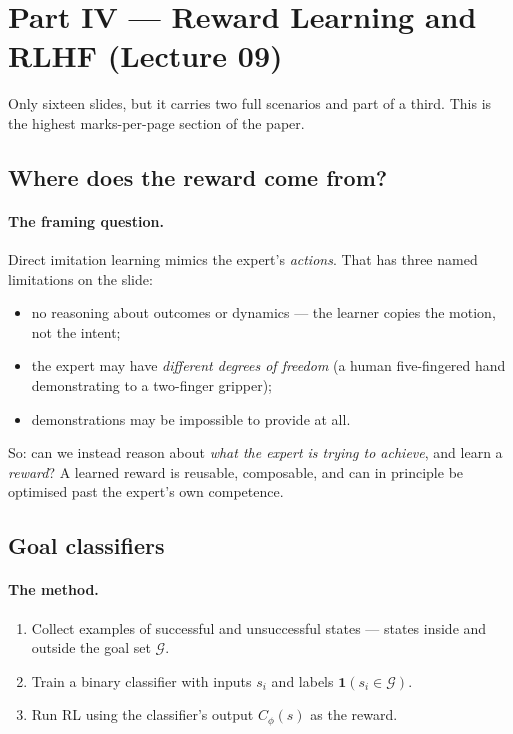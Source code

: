 \documentclass[11pt,a4paper]{article}
\begin{document}
\newpage
\section{Part IV --- Reward Learning and RLHF (Lecture 09)}

Only sixteen slides, but it carries two full scenarios and part of a third.
This is the highest marks-per-page section of the paper.

\subsection{Where does the reward come from?}

\paragraph{The framing question.} Direct imitation learning mimics the
expert's \emph{actions}. That has three named limitations on the slide:
\begin{itemize}
\item no reasoning about outcomes or dynamics --- the learner copies the
motion, not the intent;
\item the expert may have \emph{different degrees of freedom} (a human
five-fingered hand demonstrating to a two-finger gripper);
\item demonstrations may be impossible to provide at all.
\end{itemize}
So: can we instead reason about \emph{what the expert is trying to achieve},
and learn a \emph{reward}? A learned reward is reusable, composable, and can
in principle be optimised past the expert's own competence.

\subsection{Goal classifiers}

\paragraph{The method.}
\begin{enumerate}[label=\arabic*.]
\item Collect examples of successful and unsuccessful states --- states inside
and outside the goal set $\mathcal G$.
\item Train a binary classifier with inputs $s_i$ and labels
$\mathbf 1(s_i\in\mathcal G)$.
\item Run RL using the classifier's output $C_\phi(s)$ as the reward.
\end{enumerate}
\end{document}

